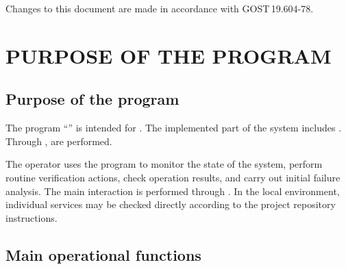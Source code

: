 \documentclass[12pt,a4paper]{extarticle}
\begin{document}
Changes to this document are made in accordance with GOST\,19.604-78\cite{gost19604}.

\clearpage

\hypersetup{linkcolor=black}
\tableofcontents
\hypersetup{linkcolor=blue}
\thispagestyle{fancy}
\clearpage

\section{PURPOSE OF THE PROGRAM}

\subsection{Purpose of the program}

\begin{hseExample}
The program \enquote{\projectname} is intended for . The implemented part of the system includes . Through ,  are performed.

The operator uses the program to monitor the state of the system, perform routine verification actions, check operation results, and carry out initial failure analysis. The main interaction is performed through . In the local environment, individual services may be checked directly according to the project repository instructions.
\end{hseExample}

\subsection{Main operational functions}
\end{document}
